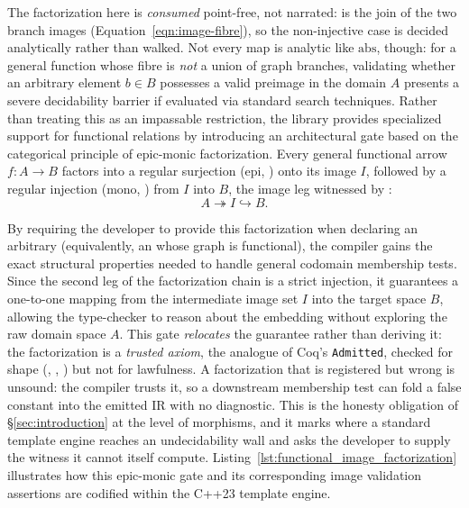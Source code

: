 \documentclass[11pt, a4paper]{article}
\begin{document}
The factorization here is \emph{consumed} point-free, not narrated:  is the join of the two branch images (Equation~\ref{eqn:image-fibre}), so the non-injective case is decided analytically rather than walked.
Not every map is analytic like $\mathrm{abs}$, though: for a general function whose fibre is \emph{not} a union of graph branches, validating whether an arbitrary element $b \in B$ possesses a valid preimage in the domain $A$ presents a severe decidability barrier if evaluated via standard search techniques.
Rather than treating this as an impassable restriction, the library provides specialized support for functional relations by introducing an architectural gate based on the categorical principle of epic-monic factorization.
Every general functional arrow $f : A \to B$ factors into a regular surjection (epi, ) onto its image $I$, followed by a regular injection (mono, ) from $I$ into $B$, the image leg witnessed by :
\begin{equation}
A \twoheadrightarrow I \hookrightarrow B.
\end{equation}

By requiring the developer to provide this factorization when declaring an arbitrary  (equivalently, an  whose graph is functional), the compiler gains the exact structural properties needed to handle general codomain membership tests.
Since the second leg of the factorization chain is a strict injection, it guarantees a one-to-one mapping from the intermediate image set $I$ into the target space $B$, allowing the type-checker to reason about the embedding without exploring the raw domain space $A$.
This gate \emph{relocates} the guarantee rather than deriving it: the factorization is a \emph{trusted axiom}, the \Cpp{} analogue of Coq's \texttt{Admitted}, checked for shape (, , ) but not for lawfulness.
A factorization that is registered but wrong is unsound: the compiler trusts it, so a downstream membership test can fold a false constant into the emitted IR with no diagnostic.
This is the honesty obligation of §\ref{sec:introduction} at the level of morphisms, and it marks where a standard \Cpp{} template engine reaches an undecidability wall and asks the developer to supply the witness it cannot itself compute.
Listing~\ref{lst:functional_image_factorization} illustrates how this epic-monic gate and its corresponding image validation assertions are codified within the C++23 template engine.
\end{document}
